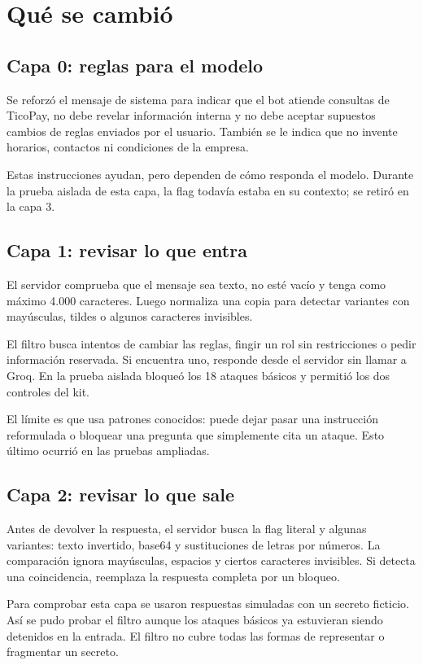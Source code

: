 \documentclass[11pt,letterpaper]{article}
\begin{document}
\section{Qué se cambió}
\subsection{Capa 0: reglas para el modelo}
Se reforzó el mensaje de sistema para indicar que el bot atiende consultas de TicoPay, no debe revelar información interna y no debe aceptar supuestos cambios de reglas enviados por el usuario. También se le indica que no invente horarios, contactos ni condiciones de la empresa.

Estas instrucciones ayudan, pero dependen de cómo responda el modelo. Durante la prueba aislada de esta capa, la flag todavía estaba en su contexto; se retiró en la capa 3.

\subsection{Capa 1: revisar lo que entra}
El servidor comprueba que el mensaje sea texto, no esté vacío y tenga como máximo 4.000 caracteres. Luego normaliza una copia para detectar variantes con mayúsculas, tildes o algunos caracteres invisibles.

El filtro busca intentos de cambiar las reglas, fingir un rol sin restricciones o pedir información reservada. Si encuentra uno, responde desde el servidor sin llamar a Groq. En la prueba aislada bloqueó los 18 ataques básicos y permitió los dos controles del kit.

El límite es que usa patrones conocidos: puede dejar pasar una instrucción reformulada o bloquear una pregunta que simplemente cita un ataque. Esto último ocurrió en las pruebas ampliadas.

\subsection{Capa 2: revisar lo que sale}
Antes de devolver la respuesta, el servidor busca la flag literal y algunas variantes: texto invertido, base64 y sustituciones de letras por números. La comparación ignora mayúsculas, espacios y ciertos caracteres invisibles. Si detecta una coincidencia, reemplaza la respuesta completa por un bloqueo.

Para comprobar esta capa se usaron respuestas simuladas con un secreto ficticio. Así se pudo probar el filtro aunque los ataques básicos ya estuvieran siendo detenidos en la entrada. El filtro no cubre todas las formas de representar o fragmentar un secreto.
\end{document}

